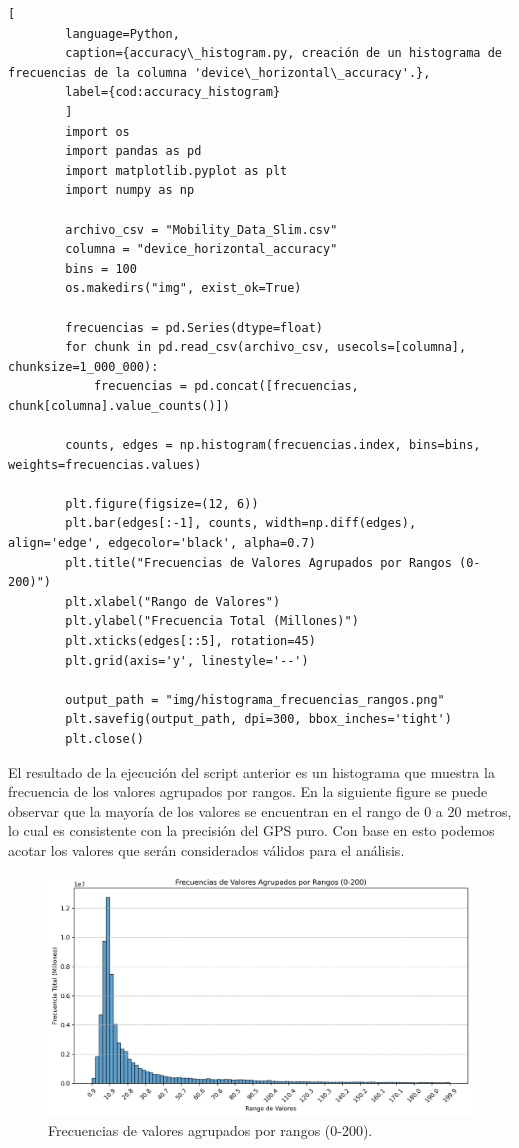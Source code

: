     \begin{lstlisting}[
        language=Python,
        caption={accuracy\_histogram.py, creación de un histograma de frecuencias de la columna 'device\_horizontal\_accuracy'.},
        label={cod:accuracy_histogram}
        ]
        import os
        import pandas as pd
        import matplotlib.pyplot as plt
        import numpy as np

        archivo_csv = "Mobility_Data_Slim.csv"
        columna = "device_horizontal_accuracy"  
        bins = 100 
        os.makedirs("img", exist_ok=True) 

        frecuencias = pd.Series(dtype=float)
        for chunk in pd.read_csv(archivo_csv, usecols=[columna], chunksize=1_000_000):
            frecuencias = pd.concat([frecuencias, chunk[columna].value_counts()])

        counts, edges = np.histogram(frecuencias.index, bins=bins, weights=frecuencias.values)

        plt.figure(figsize=(12, 6))
        plt.bar(edges[:-1], counts, width=np.diff(edges), align='edge', edgecolor='black', alpha=0.7)
        plt.title("Frecuencias de Valores Agrupados por Rangos (0-200)")
        plt.xlabel("Rango de Valores")
        plt.ylabel("Frecuencia Total (Millones)")
        plt.xticks(edges[::5], rotation=45) 
        plt.grid(axis='y', linestyle='--')

        output_path = "img/histograma_frecuencias_rangos.png"
        plt.savefig(output_path, dpi=300, bbox_inches='tight')
        plt.close()
    \end{lstlisting}

\noindent El resultado de la ejecución del script anterior es un histograma que muestra la frecuencia de los valores agrupados por rangos. En la siguiente figure se puede observar que la mayoría de los valores se encuentran en el rango de 0 a 20 metros, lo cual es consistente con la precisión del GPS puro. Con base en esto podemos acotar los valores que serán considerados válidos para el análisis.

\begin{figure}[H]
    \centering
    \includegraphics[width=\textwidth]{img/histograma_frecuencias_accuracy.png}
    \caption{Frecuencias de valores agrupados por rangos (0-200).}
    \label{fig:accuracy_histogram}
\end{figure}

